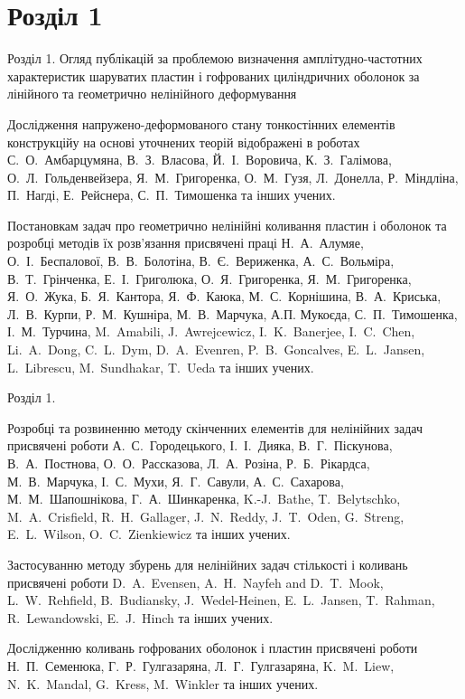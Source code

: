 \documentclass[8pt]{beamer}
\numberwithin{figure}{section}
\numberwithin{equation}{section}
\numberwithin{table}{section}
\begin{document}
\section{Розділ 1}

\begin{frame}{Розділ 1. Огляд публікацій за проблемою визначення  амплітудно-частотних характеристик шаруватих пластин і гофрованих циліндричних оболонок за лінійного та геометрично нелінійного деформування}
\indent 

\medskip Дослідження напружено-деформованого стану тонкостінних елементів конструкційу  на основі уточнених теорій відображені в роботах С.~О.~Амбарцумяна, В.~З.~Власова, Й.~І.~Воровича, К.~З.~Галімова, О.~Л.~Гольденвейзера, Я.~М.~Григоренка, О.~М.~Гузя, Л.~Донелла, Р.~Міндліна, П.~Нагді, Е.~Рейснера, С.~П.~Тимошенка та інших учених.

\medskip
Постановкам задач про геометрично нелінійні коливання пластин і оболонок та розробці методів їх розв'язання присвячені праці Н.~А.~Алумяе,  О.~І.~Беспалової, В.~В.~Болотіна, В.~Є.~Вериженка, А.~С.~Вольміра, В.~Т.~Грінченка, Е.~І.~Григолюка, О.~Я.~Григоренка, Я.~М.~Григоренка, Я.~О.~Жука, Б.~Я.~Кантора, Я.~Ф.~Каюка, М.~С.~Корнішина, В.~А.~Криська, Л.~В.~Курпи, Р.~М.~Кушніра, М.~В.~Марчука, А.П. Мукоєда, С.~П.~Тимошенка, І.~М.~Турчина, M.~Amabili, J.~Awrejcewicz, I.~K.~Banerjee, I.~C.~Chen, Li.~A.~Dong, C.~L.~Dym, D.~A.~Evenren, P.~B.~Goncalves, E.~L.~Jansen,  L.~Librescu, M.~Sundhakar, T.~Ueda та інших учених.

\end{frame}

\begin{frame}{Розділ 1.}

\medskip 
Розробці та розвиненню методу скінченних елементів для нелінійних задач присвячені роботи А.~С.~Городецького, І.~І.~Дияка, В.~Г.~Піскунова, В.~А.~Постнова, О.~О.~Рассказова, Л.~А.~Розіна, Р.~Б.~Рікардса, М.~В.~Марчука, І.~С.~Мухи, Я.~Г.~Савули, А.~С.~Сахарова, М.~М.~Шапошнікова, Г.~А.~Шинкаренка, K.-J.~Bathe, T.~Belytschko, M.~A.~Crisfield, R.~H.~Gallager, J.~N.~Reddy, J.~T.~Oden, G.~Streng, E.~L.~Wilson, O.~C.~Zienkiewicz та інших учених.

\medskip 
Застосуванню методу збурень для нелінійних задач стількості і коливань присвячені роботи D.~A.~Evensen, A.~H.~Nayfeh and D.~T.~Mook, L.~W.~Rehfield, B.~Budiansky, J.~Wedel-Heinen, E.~L.~Jansen, T.~Rahman, R.~Lewandowski, E.~J.~Hinch та інших учених.

\medskip
Дослідженню коливань гофрованих оболонок і пластин присвячені роботи Н.~П.~Семенюка, Г.~Р.~Гулгазаряна, Л.~Г.~Гулгазаряна, K.~M.~Liew, N.~K.~Mandal, G.~Kress, M.~Winkler та інших учених.


\end{frame}
\end{document}
